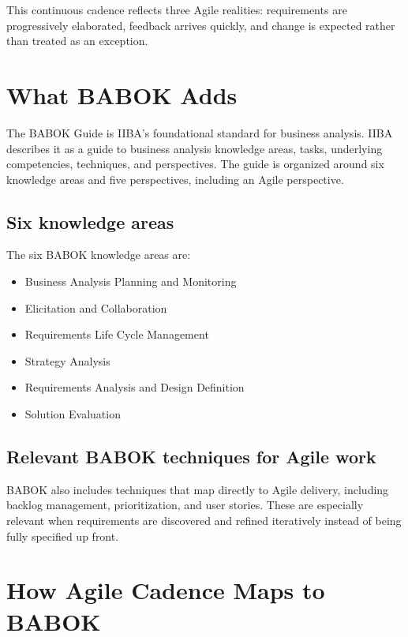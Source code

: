 \documentclass[11pt]{article}
\begin{document}
This continuous cadence reflects three Agile realities: requirements are progressively elaborated, feedback arrives quickly, and change is expected rather than treated as an exception.\cite{scrumguide}

\section{What BABOK Adds}

The BABOK Guide is IIBA's foundational standard for business analysis. IIBA describes it as a guide to business analysis knowledge areas, tasks, underlying competencies, techniques, and perspectives. The guide is organized around six knowledge areas and five perspectives, including an Agile perspective.\cite{babokmain,babokstructure,babokperspectives}

\subsection{Six knowledge areas}

The six BABOK knowledge areas are:\cite{babokstructure,baboktasks}

\begin{itemize}
  \item Business Analysis Planning and Monitoring
  \item Elicitation and Collaboration
  \item Requirements Life Cycle Management
  \item Strategy Analysis
  \item Requirements Analysis and Design Definition
  \item Solution Evaluation
\end{itemize}

\subsection{Relevant BABOK techniques for Agile work}

BABOK also includes techniques that map directly to Agile delivery, including backlog management, prioritization, and user stories. These are especially relevant when requirements are discovered and refined iteratively instead of being fully specified up front.\cite{babokbacklog,babokprioritization,babokuserstories}

\section{How Agile Cadence Maps to BABOK}
\end{document}
